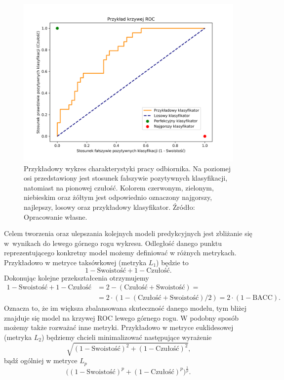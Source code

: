 \documentclass[inzynierska]{pwr_wmat_praca_dyplomowa}
\theoremstyle{plain}
\numberwithin{theorem}{chapter}
\theoremstyle{definition}
\numberwithin{theorem}{chapter}
\begin{document}
\begin{figure}[h]
	\includegraphics[width=\linewidth]{images/roc_example.png}
	\caption{Przykładowy wykres charakterystyki pracy odbiornika. Na poziomej osi przedstawiony jest stosunek fałszywie pozytywnych klasyfikacji, natomiast na pionowej czułość. Kolorem czerwonym, zielonym, niebieskim oraz żółtym jest odpowiednio oznaczony najgorszy, najlepszy, losowy oraz przykładowy klasyfikator. Źródło: Opracowanie własne.}
	\label{fig:roc_example}
\end{figure}

Celem tworzenia oraz ulepszania kolejnych modeli predykcyjnych jest zbliżanie się w~wynikach do lewego górnego rogu wykresu. Odległość danego punktu reprezentującego konkretny model możemy definiować w różnych metrykach. Przykładowo w metryce taksówkowej (metryka $L_1$) będzie to 
$$ 1 - \text{Swoistość} + 1 - \text{Czułość} \text{.}$$
Dokonując kolejne przekształcenia otrzymujemy
\begin{equation*}
\begin{split}
 1 - \text{Swoistość} + 1 - \text{Czułość} & = 2 - (\text{Czułość} + \text{Swoistość}) = \\
& = 2 \cdot (1 - (\text{Czułość} + \text{Swoistość})/2) = 2 \cdot (1 - \text{BACC}) \text{.}
\end{split}
\end{equation*}
Oznacza to, że im większa zbalansowana skuteczność danego modelu, tym bliżej znajduje się model na krzywej ROC lewego górnego rogu. W podobny sposób możemy także rozważać inne metryki. Przykładowo w metryce euklidesowej (metryka $L_2$) będziemy chcieli minimalizować następujące wyrażenie
$$ \sqrt{(1 - \text{Swoistość})^2 + (1 - \text{Czułość})^2} \text{,}$$
bądź ogólniej w metryce $L_p$
$$ \big( (1 - \text{Swoistość})^p + (1 - \text{Czułość})^p \big)^{\frac{1}{p}} \text{.} $$
\end{document}
